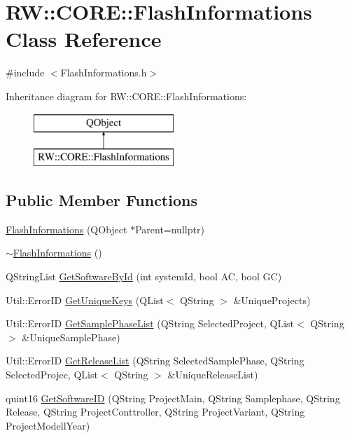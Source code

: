 \hypertarget{class_r_w_1_1_c_o_r_e_1_1_flash_informations}{}\section{RW\+:\+:C\+O\+RE\+:\+:Flash\+Informations Class Reference}
\label{class_r_w_1_1_c_o_r_e_1_1_flash_informations}


{\ttfamily \#include $<$Flash\+Informations.\+h$>$}

Inheritance diagram for RW\+:\+:C\+O\+RE\+:\+:Flash\+Informations\+:\begin{figure}[H]
\begin{center}
\leavevmode
\includegraphics[height=2.000000cm]{class_r_w_1_1_c_o_r_e_1_1_flash_informations}
\end{center}
\end{figure}
\subsection*{Public Member Functions}
\begin{DoxyCompactItemize}
\item 
\hyperlink{class_r_w_1_1_c_o_r_e_1_1_flash_informations_a4633cccd76bbe9dd83d59b364c5d05f8}{Flash\+Informations} (Q\+Object $\ast$Parent=nullptr)
\item 
\hyperlink{class_r_w_1_1_c_o_r_e_1_1_flash_informations_ac734d4d58ff3dea7dcdc5c7be4a9f7b6}{$\sim$\+Flash\+Informations} ()
\item 
Q\+String\+List \hyperlink{class_r_w_1_1_c_o_r_e_1_1_flash_informations_a54957a74376f4d9481b6e4a72ebd5aa9}{Get\+Software\+By\+Id} (int system\+Id, bool AC, bool GC)
\item 
Util\+::\+Error\+ID \hyperlink{class_r_w_1_1_c_o_r_e_1_1_flash_informations_aa811fbcf9e0267f0d211d92a0b359c32}{Get\+Unique\+Keys} (Q\+List$<$ Q\+String $>$ \&Unique\+Projects)
\item 
Util\+::\+Error\+ID \hyperlink{class_r_w_1_1_c_o_r_e_1_1_flash_informations_a0be370348f9ae51c37d7af7d4a6a660d}{Get\+Sample\+Phase\+List} (Q\+String Selected\+Project, Q\+List$<$ Q\+String $>$ \&Unique\+Sample\+Phase)
\item 
Util\+::\+Error\+ID \hyperlink{class_r_w_1_1_c_o_r_e_1_1_flash_informations_affbc5dd5c41a1417a33ec5490d2b1875}{Get\+Release\+List} (Q\+String Selected\+Sample\+Phase, Q\+String Selected\+Projec, Q\+List$<$ Q\+String $>$ \&Unique\+Release\+List)
\item 
quint16 \hyperlink{class_r_w_1_1_c_o_r_e_1_1_flash_informations_a033177c5ea7b1b56ca7eac10f781c80b}{Get\+Software\+ID} (Q\+String Project\+Main, Q\+String Samplephase, Q\+String Release, Q\+String Project\+Conttroller, Q\+String Project\+Variant, Q\+String Project\+Modell\+Year)
\end{DoxyCompactItemize}
